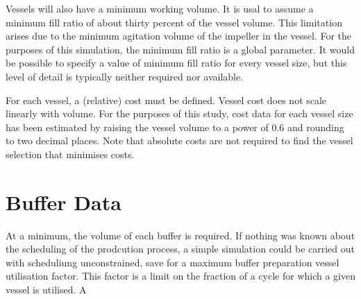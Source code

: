 Vessels will also have a minimum working volume. 
It is usal to assume a minimum fill ratio of about thirty percent of the vessel
volume. This limitation
arises due to the minimum agitation volume of the impeller in the vessel. 
For the purposes of this simulation, the minimum fill ratio is a global
parameter. It would be possible to specify a value of minimum fill ratio for
every vessel size, but this level of detail is typically neither required nor
available.

For each vessel, a (relative) cost must be defined.
Vessel cost does not scale linearly with volume.
For the purposes of this study, cost data for each vessel size has been
estimated by raising the vessel volume to a power of 0.6 and rounding to two
decimal places.
Note that absolute costs are not required to find the vessel selection that
minimises costs.

\section{Buffer Data}\label{S.data2}

At a minimum, the volume of each buffer is required.
If nothing was known about the scheduling of the prodcution process, a simple
simulation could be carried out with scheduliung unconstrained, save for a
maximum buffer preparation vessel utilisation factor.
This factor is a limit on the fraction of a cycle for which a given vessel is
utilised.  A 
